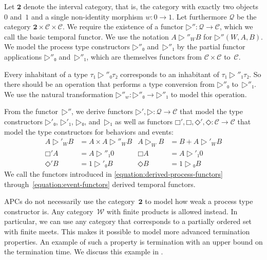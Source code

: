 \documentclass[copyright,creativecommons]{eptcs}
\begin{document}

Let $𝟐$ denote the interval category, that is, the category with exactly two
objects $0$ and~$1$ and a single non-identity morphism $w : 0 → 1$. Let
furthermore $𝒬$ be the category $𝟐 × 𝒞 × 𝒞$. We require the existence of a
functor $▷″ : 𝒬 → 𝒞$, which we call the basic temporal functor. We use the
notation $A ▷″_W B$ for $▷″(W, A, B)$. We model the process type constructors
$▷″₀$ and~$▷″₁$ by the partial functor applications $▷″₀$ and~$▷″₁$, which are
themselves functors from $𝒞 × 𝒞$ to~$𝒞$.

Every inhabitant of a type $τ₁ ▷″₀ τ₂$ corresponds to an inhabitant of $τ₁ ▷″₁
τ₂$. So there should be an operation that performs a type conversion from $▷″₀$
to~$▷″₁$. We use the natural transformation $▷″_w : ▷″₀ → ▷″₁$ to model this
operation.

From the functor~$▷″$, we derive functors $▷′, ▷ : 𝒬 → 𝒞$ that model the type
constructors $▷′₀$, $▷′₁$, $▷₀$, and~$▷₁$ as well as functors $□′, □, ◇′, ◇ : 𝒞
→ 𝒞$ that model the type constructors for behaviors and events:
\begin{align}
\label{equation:derived-process-functors}
A ▷′_W B & = A × A ▷″_W B & A ▷_W B  & = B + A ▷′_W B \\
□′A & = A ▷″₁ 0 & □A & = A ▷′₁ 0                      \\
\label{equation:event-functors}
◇′B & = 1 ▷′₀ B & ◇B & = 1 ▷₀ B
\end{align}
We call the functors introduced in \eqref{equation:derived-process-functors}
through~\eqref{equation:event-functors} derived temporal functors.

APCs do not necessarily use the category~$𝟐$ to model how weak a process type
constructor is. Any category~$𝒲$ with finite products is allowed instead. In
particular, we can use any category that corresponds to a partially ordered set
with finite meets. This makes it possible to model more advanced termination
properties. An example of such a property is termination with an upper bound on
the termination time. We discuss this example in
.

\end{document}
